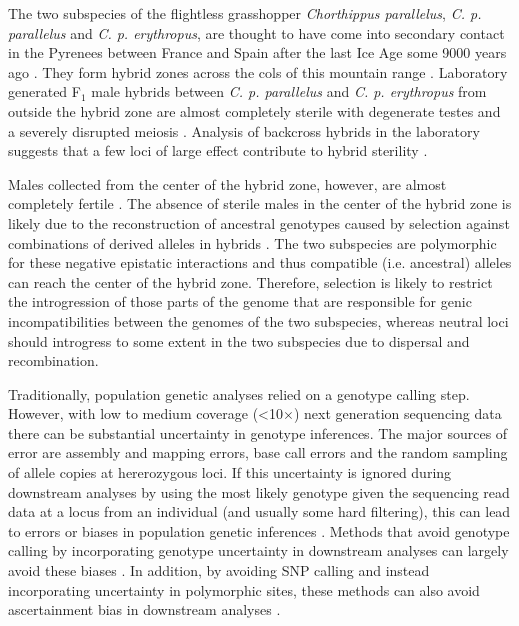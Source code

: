 \documentclass[a4paper,12pt,times,print,index,custombib,custommargin]{PhDThesisPSnPDF}\usepackage[]{graphicx}\usepackage[]{color}
\begin{document}
The two subspecies of the flightless grasshopper \textit{Chorthippus parallelus}, \textit{C. p. parallelus} and \textit{C. p. erythropus}, are thought to have come into secondary contact in the Pyrenees between France and Spain after the last Ice Age some 9000 years ago \citep{Hewitt1990}. They form hybrid zones across the cols of this mountain range \citep{Butlin1985,Butlin1985a}. 
Laboratory generated F$_{1}$ male hybrids between \textit{C. p. parallelus} and \textit{C. p. erythropus} from outside the hybrid zone are almost completely sterile with degenerate testes and a severely disrupted meiosis \citep{Hewitt1987}. Analysis of backcross hybrids in the laboratory suggests that a few loci of large effect contribute to hybrid sterility \citep{Llewellyn2008}. 

Males collected from the center of the hybrid zone, however, are almost completely fertile \citep{Ritchie1992}. The absence of sterile males in the center of the hybrid zone is likely due to the reconstruction of ancestral genotypes caused by selection against combinations of derived alleles in hybrids \citep{Butlin1998a}. The two subspecies are polymorphic for these negative epistatic interactions \citep{Shuker2005} and thus compatible (i.e. ancestral) alleles can reach the center of the hybrid zone. Therefore, selection is likely to restrict the introgression of those parts of the genome that are responsible for genic incompatibilities between the genomes of the two subspecies, whereas neutral loci should introgress to some extent in the two subspecies due to dispersal and recombination. 


Traditionally, population genetic analyses relied on a genotype calling step. However, with low to medium coverage (<10$\times$) next generation sequencing data there can be substantial uncertainty in genotype inferences. The major sources of error are assembly and mapping errors, base call errors and the random sampling of allele copies at hererozygous loci. If this uncertainty is ignored during downstream analyses by using the most likely genotype given the sequencing read data at a locus from an individual (and usually some hard filtering), this can lead to errors or biases in population genetic inferences \citep{Crawford2012a, Johnson2008}. Methods that avoid genotype calling by incorporating genotype uncertainty in downstream analyses can largely avoid these biases \citep{Nielsen2012, Li2011}. In addition, by avoiding SNP calling and instead incorporating uncertainty in polymorphic sites, these methods can also avoid ascertainment bias in downstream analyses \citep{Albrechtsen2010}. 
\end{document}

